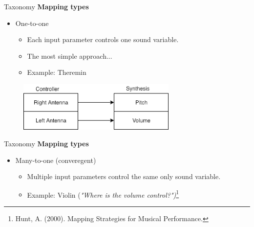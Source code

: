 \documentclass{beamer}
\begin{document}
\begin{frame}{Taxonomy}
    \textbf{Mapping types}\\
    \vspace{5mm}
    \begin{itemize}
        \item One-to-one
        \begin{itemize}
            \item Each input parameter controls one sound variable.
            \item The most simple approach...
            \item Example: Theremin
         \end{itemize}
    \end{itemize}
    \begin{figure}[h]
        \includegraphics[width=0.7\textwidth]{theremin_mapping.png}
    \end{figure}
\end{frame}

\begin{frame}{Taxonomy}
    \textbf{Mapping types}\\
    \vspace{5mm}
    \begin{itemize}
        \item Many-to-one (converegent)
        \begin{itemize}
            \item Multiple input parameters control the same only sound variable.
            \item Example: Violin (\textit{"Where is the volume control?")}\footnote{Hunt, A. (2000). Mapping Strategies for Musical Performance.}
         \end{itemize}
    \end{itemize}
\end{frame}
\end{document}
